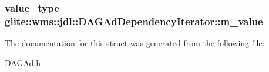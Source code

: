 \hypertarget{structglite_1_1wms_1_1jdl_1_1DAGAdDependencyIterator_o5}{
\subsubsection[m\_\-value]{\setlength{\rightskip}{0pt plus 5cm}value\_\-type \hyperlink{structglite_1_1wms_1_1jdl_1_1DAGAdDependencyIterator_o5}{glite::wms::jdl::DAGAd\-Dependency\-Iterator::m\_\-value}}}
\label{structglite_1_1wms_1_1jdl_1_1DAGAdDependencyIterator_o5}




The documentation for this struct was generated from the following file:\begin{CompactItemize}
\item 
\hyperlink{DAGAd_8h}{DAGAd.h}\end{CompactItemize}

